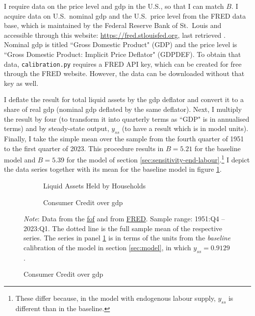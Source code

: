 \documentclass[a4paper,12pt]{article} %
\numberwithin{equation}{section} %
\numberwithin{figure}{section}
\numberwithin{table}{section}
\begin{document}
\begin{refsection}
\begin{appendices}
I require data on the price level and \Gls{gdp} in the U.S., so that I can match $B$. I acquire data on U.S.~nominal \Gls{gdp} and the U.S.~price level from the FRED data base, which is maintained by the Federal Reserve Bank of St.~Louis and accessible through this website: \url{https://fred.stlouisfed.org}, last retrieved . Nominal \Gls{gdp} is titled ``Gross Domestic Product" (GDP) and the price level is ``Gross Domestic Product: Implicit Price Deflator" (GDPDEF). To obtain that data, \texttt{calibration.py} requires a FRED API key, which can be created for free through the FRED website. However, the data can be downloaded without that key as well.

I deflate the result for total liquid assets by the \Gls{gdp} deflator and convert it to a share of real \Gls{gdp} (nominal \Gls{gdp} deflated by the same deflator). Next, I multiply the result by four (to transform it into quarterly terms as ``GDP" is in annualised terms) and by steady-state output, $y_{ss}$ (to have a result which is in model units). Finally, I take the simple mean over the sample from the fourth quarter of 1951 to the first quarter of 2023. This procedure results in $B=5.21$ for the baseline model and $B=5.39$ for the model of section \ref{sec:sensitivity-end-labour}.\footnote{These differ because, in the model with endogenous labour supply, $y_{ss}$ is different than in the baseline.} I depict the data series together with its mean for the baseline model in figure \ref{fig:app-calibration-liquid}.

\begin{figure}[H]
    \caption{Data for Baseline Model Calibration}
    \label{fig:app-calibration}
    \centering
    \begin{subfigure}[b]{0.49\textwidth}
    \caption{Liquid Assets Held by Households}
    \label{fig:app-calibration-liquid}
         \centering
         
     \end{subfigure}
     \hfill
     \begin{subfigure}[b]{0.49\textwidth}
     \caption{Consumer Credit over \Gls{gdp}} 
    \label{fig:app-calibration-debt}
         \centering
         
     \end{subfigure}

    \vspace{10pt}
    
    \begin{minipage}{\textwidth} 
    \footnotesize
    \textit{Note}: Data from the \href{https://www.federalreserve.gov/releases/z1/}{\Gls{fof}} and from \href{https://fred.stlouisfed.org}{FRED}. Sample range: 1951:Q4 -- 2023:Q1. The dotted line is the full sample mean of the respective series. The series in panel \ref{fig:app-calibration-liquid} is in terms of the units from the \textit{baseline} calibration of the model in section \ref{sec:model}, in which $y_{ss} = 0.9129$. 
    \end{minipage}
\end{figure}


\end{appendices}
\end{refsection}
\end{document}
